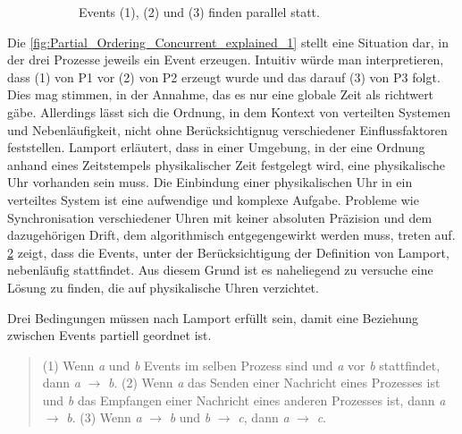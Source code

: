 \begin{figure}[!ht]
\begin{subfigure}[t]{.49\linewidth}
		\caption[Abbildung]{Events (1), (2) und (3) finden parallel statt.}
		\label{fig:Partial_Ordering_Concurrent_explained_2}
	\end{subfigure}
\caption[Partielle Ordnung der Events dreier Prozesse]{}
\end{figure} 


Die \cref{fig:Partial_Ordering_Concurrent_explained_1} stellt eine Situation dar, in der drei Prozesse jeweils ein Event erzeugen. Intuitiv würde man interpretieren, dass (1) von P1 vor (2) von P2 erzeugt wurde und das darauf (3) von P3 folgt. Dies mag stimmen, in der Annahme, das es nur eine globale Zeit als richtwert gäbe. Allerdings lässt sich die Ordnung, in dem Kontext von verteilten Systemen und Nebenläufigkeit, nicht ohne Berücksichtignug verschiedener Einflussfaktoren feststellen. Lamport erläutert, dass in einer Umgebung, in der eine Ordnung anhand eines Zeitstempels physikalischer Zeit festgelegt wird, eine physikalische Uhr vorhanden sein muss. Die Einbindung einer physikalischen Uhr in ein verteiltes System ist eine aufwendige und komplexe Aufgabe. Probleme wie Synchronisation verschiedener Uhren mit keiner absoluten Präzision und dem dazugehörigen Drift, dem algorithmisch entgegengewirkt werden muss, treten auf. \cref{fig:Partial_Ordering_Concurrent_explained_2} zeigt, dass die Events, unter der Berücksichtigung der Definition von Lamport, nebenläufig stattfindet.  Aus diesem Grund ist es naheliegend zu versuche eine Lösung zu finden, die auf physikalische Uhren verzichtet.


Drei Bedingungen müssen nach Lamport erfüllt sein, damit eine Beziehung zwischen Events partiell geordnet ist. 
\begin{quote}
	\glqq (1) Wenn \emph{a} und \emph{b} Events im selben Prozess sind und \emph{a} vor \emph{b} stattfindet, dann \emph{a} $\rightarrow$ \emph{b}. (2) Wenn \emph{a} das Senden einer Nachricht eines Prozesses ist und \emph{b} das Empfangen einer Nachricht eines anderen Prozesses ist, dann \emph{a} $\rightarrow$ \emph{b}. (3) Wenn \emph{a} $\rightarrow$ \emph{b} und \emph{b} $\rightarrow$ \emph{c}, dann \emph{a} $\rightarrow$ \emph{c}.\grqq \:
\end{quote}

